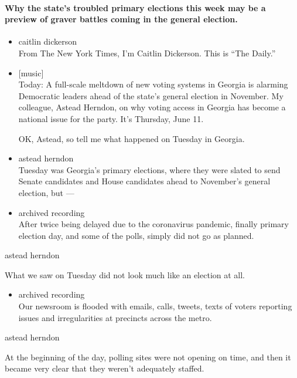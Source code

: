 \hypertarget{why-the-states-troubled-primary-elections-this-week-may-be-a-preview-of-graver-battles-coming-in-the-general-election}{%
\paragraph{Why the state's troubled primary elections this week may be a
preview of graver battles coming in the general
election.}\label{why-the-states-troubled-primary-elections-this-week-may-be-a-preview-of-graver-battles-coming-in-the-general-election}}

\begin{itemize}
\item
  caitlin dickerson\\
  From The New York Times, I'm Caitlin Dickerson. This is ``The Daily.''
\item
  {[}music{]}\\
  Today: A full-scale meltdown of new voting systems in Georgia is
  alarming Democratic leaders ahead of the state's general election in
  November. My colleague, Astead Herndon, on why voting access in
  Georgia has become a national issue for the party. It's Thursday, June
  11.

  OK, Astead, so tell me what happened on Tuesday in Georgia.
\item
  astead herndon\\
  Tuesday was Georgia's primary elections, where they were slated to
  send Senate candidates and House candidates ahead to November's
  general election, but ---
\item
  archived recording\\
  After twice being delayed due to the coronavirus pandemic, finally
  primary election day, and some of the polls, simply did not go as
  planned.
\end{itemize}

astead herndon

What we saw on Tuesday did not look much like an election at all.

\begin{itemize}
\tightlist
\item
  archived recording\\
  Our newsroom is flooded with emails, calls, tweets, texts of voters
  reporting issues and irregularities at precincts across the metro.
\end{itemize}

astead herndon

At the beginning of the day, polling sites were not opening on time, and
then it became very clear that they weren't adequately staffed.

